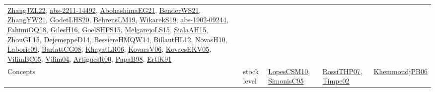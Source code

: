 {\begin{longtable}{lp{3cm}>{\raggedright}p{6cm}>{\raggedright}p{6cm}p{8cm}}
\href{papers/ZhangJZL22.pdf}{ZhangJZL22}\cite{ZhangJZL22}, \href{articles/abs-2211-14492.pdf}{abs-2211-14492}\cite{abs-2211-14492}, \href{articles/AbohashimaEG21.pdf}{AbohashimaEG21}\cite{AbohashimaEG21}, \href{papers/BenderWS21.pdf}{BenderWS21}\cite{BenderWS21}, \href{articles/ZhangYW21.pdf}{ZhangYW21}\cite{ZhangYW21}, \href{papers/GodetLHS20.pdf}{GodetLHS20}\cite{GodetLHS20}, \href{papers/BehrensLM19.pdf}{BehrensLM19}\cite{BehrensLM19}, \href{articles/WikarekS19.pdf}{WikarekS19}\cite{WikarekS19}, \href{articles/abs-1902-09244.pdf}{abs-1902-09244}\cite{abs-1902-09244}, \href{articles/FahimiOQ18.pdf}{FahimiOQ18}\cite{FahimiOQ18}, \href{papers/GilesH16.pdf}{GilesH16}\cite{GilesH16}, \href{articles/GoelSHFS15.pdf}{GoelSHFS15}\cite{GoelSHFS15}, \href{papers/MelgarejoLS15.pdf}{MelgarejoLS15}\cite{MelgarejoLS15}, \href{papers/SialaAH15.pdf}{SialaAH15}\cite{SialaAH15}, \href{papers/ZhouGL15.pdf}{ZhouGL15}\cite{ZhouGL15}, \href{papers/DejemeppeD14.pdf}{DejemeppeD14}\cite{DejemeppeD14}, \href{papers/BessiereHMQW14.pdf}{BessiereHMQW14}\cite{BessiereHMQW14}, \href{papers/BillautHL12.pdf}{BillautHL12}\cite{BillautHL12}, \href{articles/NovasH10.pdf}{NovasH10}\cite{NovasH10}, \href{papers/Laborie09.pdf}{Laborie09}\cite{Laborie09}, \href{papers/BarlattCG08.pdf}{BarlattCG08}\cite{BarlattCG08}, \href{articles/KhayatLR06.pdf}{KhayatLR06}\cite{KhayatLR06}, \href{papers/KovacsV06.pdf}{KovacsV06}\cite{KovacsV06}, \href{papers/KovacsEKV05.pdf}{KovacsEKV05}\cite{KovacsEKV05}, \href{articles/VilimBC05.pdf}{VilimBC05}\cite{VilimBC05}, \href{papers/Vilim04.pdf}{Vilim04}\cite{Vilim04}, \href{articles/ArtiguesR00.pdf}{ArtiguesR00}\cite{ArtiguesR00}, \href{articles/PapaB98.pdf}{PapaB98}\cite{PapaB98}, \href{papers/ErtlK91.pdf}{ErtlK91}\cite{ErtlK91}\\
Concepts & stock level & \href{articles/LopesCSM10.pdf}{LopesCSM10}\cite{LopesCSM10}, \href{papers/SimonisC95.pdf}{SimonisC95}\cite{SimonisC95} & \href{papers/RossiTHP07.pdf}{RossiTHP07}\cite{RossiTHP07}, \href{articles/Timpe02.pdf}{Timpe02}\cite{Timpe02} & \href{papers/KhemmoudjPB06.pdf}{KhemmoudjPB06}\cite{KhemmoudjPB06}\\

\end{longtable}}
